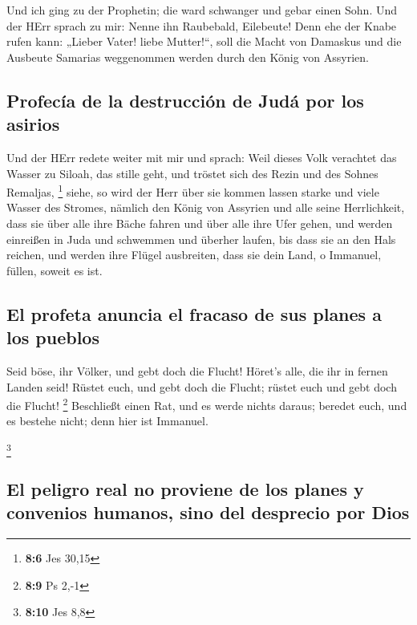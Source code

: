  Und ich ging zu der Prophetin; die ward schwanger und
gebar einen Sohn. Und der HErr sprach zu mir: Nenne ihn Raubebald,
Eilebeute!  Denn ehe der Knabe rufen kann: „Lieber Vater!
liebe Mutter!{}``, soll die Macht von Damaskus und die Ausbeute Samarias
weggenommen werden durch den König von Assyrien.

\hypertarget{profecuxeda-de-la-destrucciuxf3n-de-juduxe1-por-los-asirios}{%
\subsection{Profecía de la destrucción de Judá por los
asirios}\label{profecuxeda-de-la-destrucciuxf3n-de-juduxe1-por-los-asirios}}

 Und der HErr redete weiter mit mir und sprach:
 Weil dieses Volk verachtet das Wasser zu Siloah, das
stille geht, und tröstet sich des Rezin und des Sohnes Remaljas,
\footnote{\textbf{8:6} Jes 30,15}  siehe, so wird der Herr
über sie kommen lassen starke und viele Wasser des Stromes, nämlich den
König von Assyrien und alle seine Herrlichkeit, dass sie über alle ihre
Bäche fahren und über alle ihre Ufer gehen,  und werden
einreißen in Juda und schwemmen und überher laufen, bis dass sie an den
Hals reichen, und werden ihre Flügel ausbreiten, dass sie dein Land, o
Immanuel, füllen, soweit es ist.

\hypertarget{el-profeta-anuncia-el-fracaso-de-sus-planes-a-los-pueblos}{%
\subsection{El profeta anuncia el fracaso de sus planes a los
pueblos}\label{el-profeta-anuncia-el-fracaso-de-sus-planes-a-los-pueblos}}

 Seid böse, ihr Völker, und gebt doch die Flucht! Höret's
alle, die ihr in fernen Landen seid! Rüstet euch, und gebt doch die
Flucht; rüstet euch und gebt doch die Flucht! \footnote{\textbf{8:9} Ps
  2,-1}  Beschließt einen Rat, und es werde nichts
daraus; beredet euch, und es bestehe nicht; denn hier ist Immanuel.

\footnote{\textbf{8:10} Jes 8,8}

\hypertarget{el-peligro-real-no-proviene-de-los-planes-y-convenios-humanos-sino-del-desprecio-por-dios}{%
\subsection{El peligro real no proviene de los planes y convenios
humanos, sino del desprecio por
Dios}\label{el-peligro-real-no-proviene-de-los-planes-y-convenios-humanos-sino-del-desprecio-por-dios}}

